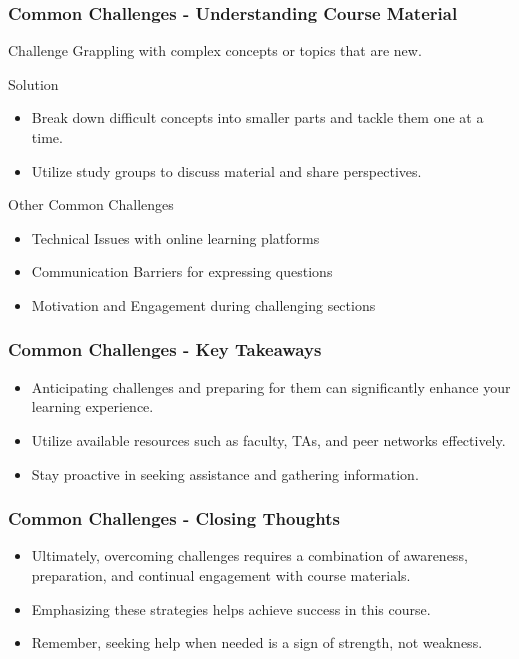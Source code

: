\documentclass[aspectratio=169]{beamer}
\begin{document}
\begin{frame}[fragile]
    \frametitle{Common Challenges - Understanding Course Material}
    \begin{block}{Challenge}
        Grappling with complex concepts or topics that are new.
    \end{block}
    \begin{block}{Solution}
        \begin{itemize}
            \item Break down difficult concepts into smaller parts and tackle them one at a time.
            \item Utilize study groups to discuss material and share perspectives.
        \end{itemize}
    \end{block}

    \begin{block}{Other Common Challenges}
        \begin{itemize}
            \item Technical Issues with online learning platforms
            \item Communication Barriers for expressing questions
            \item Motivation and Engagement during challenging sections
        \end{itemize}
    \end{block}
\end{frame}

\begin{frame}[fragile]
    \frametitle{Common Challenges - Key Takeaways}
    \begin{itemize}
        \item Anticipating challenges and preparing for them can significantly enhance your learning experience.
        \item Utilize available resources such as faculty, TAs, and peer networks effectively.
        \item Stay proactive in seeking assistance and gathering information.
    \end{itemize}
\end{frame}

\begin{frame}[fragile]
    \frametitle{Common Challenges - Closing Thoughts}
    \begin{itemize}
        \item Ultimately, overcoming challenges requires a combination of awareness, preparation, and continual engagement with course materials.
        \item Emphasizing these strategies helps achieve success in this course.
        \item Remember, seeking help when needed is a sign of strength, not weakness.
    \end{itemize}
\end{frame}
\end{document}
